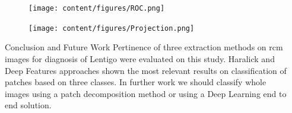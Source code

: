 \documentclass[final]{beamer}
\newlength{\sepmargin}
\newlength{\onecolwid}
\begin{document}
\begin{frame}[t]
\begin{columns}[t]
\begin{column}{\onecolwid}
\begin{block}{ }
                    \begin{multicols}{2}
                    \begin{figure}
                    	\vspace*{-0.95cm}
                        \texttt{[image: content/figures/ROC.png]}
    				\end{figure}
                    \begin{figure}
                    	\vspace*{-0.95cm}
                        \texttt{[image: content/figures/Projection.png]}
    				\end{figure}
                    \end{multicols}
            \end{block}
            
    		\begin{block}{Conclusion and Future Work}
            \justifying
              Pertinence of three extraction methods on \ac{rcm} images for diagnosis of Lentigo were evaluated on this study. Haralick and Deep Features approaches shown the most relevant results on classification of patches based on three classes. In further work we should classify whole images using a patch decomposition method or using a Deep Learning end to end solution.
            \end{block}
        \end{column}
          
        \begin{column}{\sepmargin}\end{column} %
    \end{columns} 
       
    \begin{columns}[t] %
      

\end{columns}
\end{frame}
\end{document}
